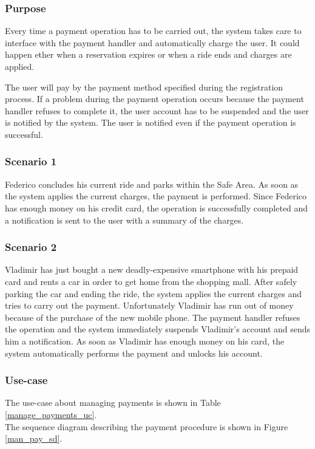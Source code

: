 \subsubsection{Purpose}
Every time a payment operation has to be carried out, the system takes care to interface with the payment handler and automatically charge the user. It could happen ether when a reservation expires or when a ride ends and charges are applied.

The user will pay by the payment method specified during the registration process. If a problem during the payment operation occurs because the payment handler refuses to complete it, the user account has to be suspended and the user is notified by the system. The user is notified even if the payment operation is successful.

\subsubsection{Scenario 1}
Federico concludes his current ride and parks within the Safe Area. As soon as the system applies the current charges, the payment is performed. Since Federico has enough money on his credit card, the operation is successfully completed and a notification is sent to the user with a summary of the charges.

\subsubsection{Scenario 2}
Vladimir has just bought a new deadly-expensive smartphone with his prepaid card and rents a car in order to get home from the shopping mall. After safely parking the car and ending the ride, the system applies the current charges and tries to carry out the payment. Unfortunately Vladimir has run out of money because of the purchase of the new mobile phone. The payment handler refuses the operation and the system immediately suspends Vladimir's account and sends him a notification. As soon as Vladimir has enough money on his card, the system automatically performs the payment and unlocks his account.

\subsubsection{Use-case}
The use-case about managing payments is shown in Table \ref{manage_payments_uc}. \\
The sequence diagram describing the payment procedure is shown in Figure \ref{man_pay_sd}.

